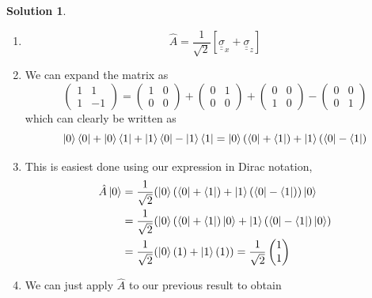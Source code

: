 \documentclass[10pt]{article}
\theoremstyle{definition}
\newtheorem{soln}{Solution}
\newcommand{\dul}[1]{\underline{\underline{#1}}}
\begin{document}
\begin{soln}~
  \begin{enumerate}[label=(\alph*)]
    \item $$\hat{A}=\frac{1}{\sqrt{2}}\left[ \dul{\sigma}_x+\dul{\sigma}_z\right]$$
    \item We can expand the matrix as
          $$\begin{pmatrix}
              1 & 1  \\
              1 & -1
            \end{pmatrix}=\begin{pmatrix}
              1 & 0 \\
              0 & 0
            \end{pmatrix}+\begin{pmatrix}
              0 & 1 \\
              0 & 0
            \end{pmatrix}+\begin{pmatrix}
              0 & 0 \\
              1 & 0
            \end{pmatrix}-\begin{pmatrix}
              0 & 0 \\
              0 & 1
            \end{pmatrix}$$
          which can clearly be written as
          $$\ket{0}\bra{0}+\ket{0}\bra{1}+\ket{1}\bra{0}-\ket{1}\bra{1}=\ket{0}(\bra{0}+\bra{1})+\ket{1}(\bra{0}-\bra{1})$$
    \item This is easiest done using our expression in Dirac notation,
          \begin{align*}
            \hat{A}\ket{0} & =\frac{1}{\sqrt{2}}(\ket{0}(\bra{0}+\bra{1})+\ket{1}(\bra{0}-\bra{1}))\ket{0}        \\
                           & =\frac{1}{\sqrt{2}}(\ket{0}(\bra{0}+\bra{1})\ket{0}+\ket{1}(\bra{0}-\bra{1})\ket{0}) \\
                           & =\frac{1}{\sqrt{2}}(\ket{0}(1)+\ket{1}(1))=\frac{1}{\sqrt{2}}\begin{pmatrix}
                                                                                            1 \\1
                                                                                          \end{pmatrix}          \\
          \end{align*}
    \item We can just apply $\hat{A}$ to our previous result to obtain

\end{enumerate}
\end{soln}
\end{document}
